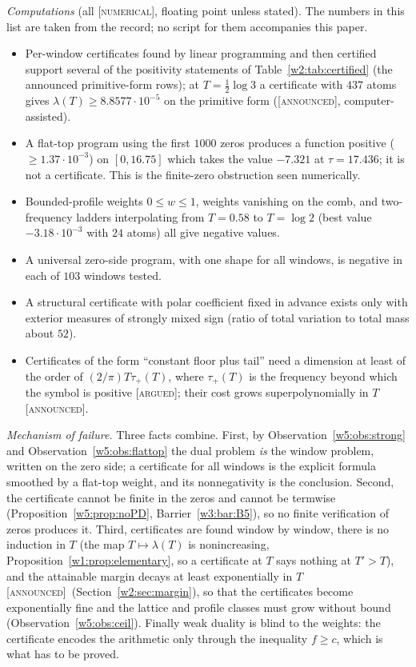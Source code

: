 \documentclass[11pt]{amsart}
\theoremstyle{definition}
\theoremstyle{remark}
\numberwithin{equation}{section}
\newcommand{\lam}{\lambda(T)}                          %
\newcommand{\stag}[1]{\textsc{[#1]}}
\newcommand{\ARGUED}{\stag{argued}}
\newcommand{\NUM}{\stag{numerical}}
\newcommand{\ANNOUNCED}{\stag{announced}}
\newcommand{\entry}[1]{\par\smallskip\noindent\textit{#1.}\enspace}
\begin{document}
\emph{Computations} (all \NUM, floating point unless stated). The numbers in this list are taken from the record; no
script for them accompanies this paper.
\begin{itemize}
\item Per-window certificates found by linear programming and then certified support several of the positivity statements
of Table~\ref{w2:tab:certified} (the announced primitive-form rows); at $T=\frac12\log3$ a certificate with $437$ atoms gives $\lam\ge8.8577\cdot10^{-5}$
on the primitive form (\ANNOUNCED, computer-assisted).
\item A flat-top program using the first $1000$ zeros produces a function positive ($\ge1.37\cdot10^{-3}$) on
$[0,16.75]$ which takes the value $-7.321$ at $\tau=17.436$; it is not a certificate. This is the finite-zero obstruction
seen numerically.
\item Bounded-profile weights $0\le w\le1$, weights vanishing on the comb, and two-frequency ladders interpolating from
$T=0.58$ to $T=\log2$ (best value $-3.18\cdot10^{-3}$ with $24$ atoms) all give negative values.
\item A universal zero-side program, with one shape for all windows, is negative in each of $103$ windows tested.
\item A structural certificate with polar coefficient fixed in advance exists only with exterior measures of strongly mixed
sign (ratio of total variation to total mass about $52$).
\item Certificates of the form ``constant floor plus tail'' need a dimension at least of the order of $(2/\pi)T\tau_+(T)$,
where $\tau_+(T)$ is the frequency beyond which the symbol is positive \ARGUED; their cost grows superpolynomially in $T$
\ANNOUNCED.
\end{itemize}

\entry{Mechanism of failure} Three facts combine. First, by Observation~\ref{w5:obs:strong} and
Observation~\ref{w5:obs:flattop} the dual problem \emph{is} the window problem, written on the zero side; a certificate for
all windows is the explicit formula smoothed by a flat-top weight, and its nonnegativity is the conclusion. Second, the
certificate cannot be finite in the zeros and cannot be termwise (Proposition~\ref{w5:prop:noPD},
Barrier~\ref{w3:bar:B5}), so no finite verification of zeros produces it. Third, certificates are found window by window,
there is no induction in $T$ (the map $T\mapsto\lam$ is nonincreasing, Proposition~\ref{w1:prop:elementary}, so a
certificate at $T$ says nothing at $T'>T$), and the attainable margin decays at least exponentially in $T$
\ANNOUNCED\ (Section~\ref{w2:sec:margin}), so that the certificates become exponentially fine and the lattice and profile classes
must grow without bound (Observation~\ref{w5:obs:ceil}). Finally weak duality is blind to the weights: the certificate
encodes the arithmetic only through the inequality $f\ge c$, which is what has to be proved.
\end{document}
